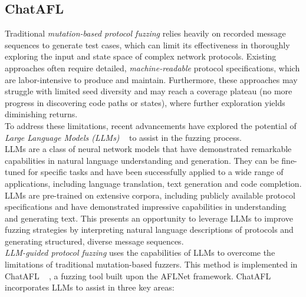 \subsection{ChatAFL}
Traditional \textit{mutation-based protocol fuzzing} relies heavily on recorded message sequences to generate test cases, which can limit its effectiveness in thoroughly exploring the input and state space of complex network protocols. Existing approaches often require detailed, \textit{machine-readable} protocol specifications, which are labor-intensive to produce and maintain. Furthermore, these approaches may struggle with limited seed diversity and may reach a coverage plateau (no more progress in discovering code paths or states), where further exploration yields diminishing returns.
\\To address these limitations, recent advancements have explored the potential of \textit{Large Language Models (LLMs)} ~\cite{minaee2024largelanguagemodelssurvey} to assist in the fuzzing process.
\\LLMs are a class of neural network models that have demonstrated remarkable capabilities in natural language understanding and generation. They can be fine-tuned for specific tasks and have been successfully applied to a wide range of applications, including language translation, text generation and code completion.
\\LLMs are pre-trained on extensive corpora, including publicly available protocol specifications and have demonstrated impressive capabilities in understanding and generating text. This presents an opportunity to leverage LLMs to improve fuzzing strategies by interpreting natural language descriptions of protocols and generating structured, diverse message sequences.
\\\textit{LLM-guided protocol fuzzing} uses the capabilities of LLMs to overcome the limitations of traditional mutation-based fuzzers. This method is implemented in ChatAFL ~\cite{chatafl} , a fuzzing tool built upon the AFLNet framework. ChatAFL incorporates LLMs to assist in three key areas:

